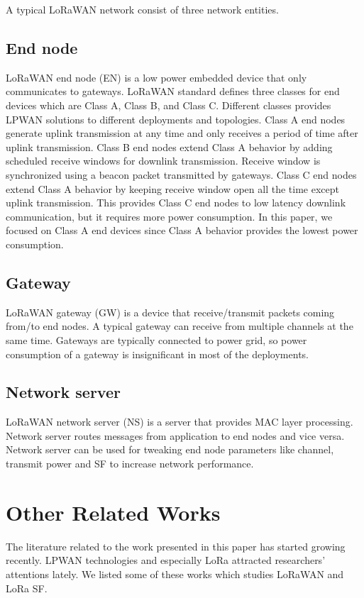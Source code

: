 \documentclass[conference]{IEEEtran}
\begin{document}
\par A typical LoRaWAN network consist of three network entities.

\subsection{End node}
\par LoRaWAN end node (EN) is a low power embedded device that only communicates to gateways. LoRaWAN standard defines three classes for end devices which are Class A, Class B, and Class C. Different classes provides LPWAN solutions to different deployments and topologies. Class A end nodes generate uplink transmission at any time and only receives a period of time after uplink transmission. Class B end nodes extend Class A behavior by adding scheduled receive windows for downlink transmission. Receive window is synchronized using a beacon packet transmitted by gateways. Class C end nodes extend Class A behavior by keeping receive window open all the time except uplink transmission. This provides Class C end nodes to low latency downlink communication, but it requires more power consumption. In this paper, we focused on Class A end devices since Class A behavior provides the lowest power consumption.

\subsection{Gateway}
\par LoRaWAN gateway (GW) is a device that receive/transmit packets coming from/to end nodes. A typical gateway can receive from multiple channels at the same time. Gateways are typically connected to power grid, so power consumption of a gateway is insignificant in most of the deployments.

\subsection{Network server}
\par LoRaWAN network server (NS) is a server that provides MAC layer processing. Network server routes messages from application to end nodes and vice versa. Network server can be used for tweaking end node parameters like channel, transmit power and SF to increase network performance.


\section{Other Related Works} \label{Other Related Works}
\par The literature related to the work presented in this paper has started growing recently. LPWAN technologies and especially LoRa attracted researchers’ attentions lately. We listed some of these works which studies LoRaWAN and LoRa SF.
\end{document}
